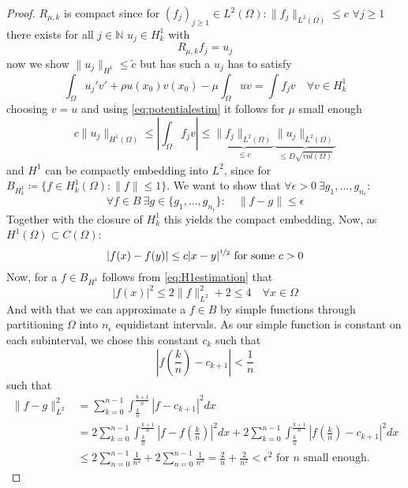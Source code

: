 \documentclass[fontsize=14pt,a4paper,DIV=1]{scrartcl}
\numberwithin{equation}{section}
\newcommand{\N}{\mathbb{N}}
\begin{document}
	\begin{proof}
	$R_{\mu, k}$ is compact since for $(f_{j})_{j \geq 1} \in L^{2}(\Omega): \|f_{j} \|_{L^{2}(\Omega)} \leq c$ $\forall j \geq 1$ there exists for all $j \in \N$  $u_{j} \in H^{1}_{k}$ with
		\[ R_{\mu, k} f_{j} = u_{j} \]
	now we show $\| u_{j} \|_{H^{1}} \leq \tilde{c}$ but has such a $u_{j}$ has to satisfy
		\[ \int_{\Omega} u_{j}' v' + \rho u(x_{0}) v(x_{0}) - \mu \int_{\Omega} u v = \int f_{j} v \quad \forall v \in H^{1}_{k} \]
	choosing $v = u$ and using \eqref{eq:potentialestim} it follows for $\mu$ small enough
		\[ c \| u_{j} \|_{H^{1}(\Omega)} \leq | \int_{\Omega} f_{j} v | \leq \underbrace{\| f_{j} \|_{L^{2}(\Omega)}}_{\leq c} \underbrace{\| u_{j} \|_{L^{2}(\Omega)}}_{\leq D \sqrt{vol(\Omega)}} \]
	and $H^{1}$ can be compactly embedding into $L^{2}$, since for $B_{H^{1}_{k}} \coloneqq \{ f \in H^{1}_{k}(\Omega) : \| f \| \leq 1 \}$. We want to show that $\forall \epsilon > 0 ~\exists g_{1}, \dotsc, g_{n_{\epsilon}}$:
	\[ \forall f \in B ~\exists g \in \{ g_{1}, \dotsc, g_{n_{\epsilon}} \} : \quad \| f - g \|\leq \epsilon \]
	Together with the closure of $H^{1}_{k}$ this yields the compact embedding. Now, as $H^1(\Omega) \subset C(\Omega)$: 
		\begin{equation}
			|f(x) - f(y)| \leq c |x - y|^{\nicefrac{1}{2}} \text{ for some } c > 0 \label{eq:H1estimation}
		\end{equation} 
		Now, for a $f \in B_{H^{1}}$ follows from \eqref{eq:H1estimation} that 
		\[ |f(x)|^{2} \leq 2 \| f \|^{2}_{L^{2}} + 2 \leq 4 \quad \forall x \in \Omega\]
		And with that we can approximate a $f \in B$ by simple functions through partitioning $\Omega$ into $n_{\epsilon}$ equidistant intervals. As our simple function is constant on each subinterval, we chose this constant $c_{k}$ such that
		\[ |f(\frac{k}{n}) - c_{k + 1}| < \frac{1}{n}  \]
		such that
		\begin{align*}
			\| f - g \|^{2}_{L^{2}} & = \sum_{k = 0}^{n-1} \int_{\frac{k}{n}}^{\frac{k+1}{n}} | f - c_{k+1} |^{2} dx \\
				& =  2 \sum_{k = 0}^{n-1} \int_{\frac{k}{n}}^{\frac{k+1}{n}} | f - f(\frac{k}{n}) |^{2} dx +  2 \sum_{k = 0}^{n-1} \int_{\frac{k}{n}}^{\frac{k+1}{n}} | f(\frac{k}{n}) - c_{k+1} |^{2} dx \\
				& \leq 2 \sum_{n = 0}^{n-1} \frac{1}{n^{2}} + 2 \sum_{n=0}^{n-1} \frac{1}{n^{3}} = \frac{2}{n} + \frac{2}{n^{2}} < \epsilon^{2} \text{ for } n \text{ small enough.}
		\end{align*}		
	\end{proof}	
		
\end{document}
